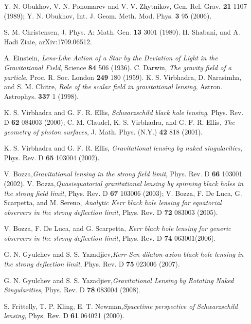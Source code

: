 \documentclass[aps,showpacs,preprintnumbers,amsmath,amssymb]{revtex4}
\begin{document}
\begin{thebibliography}{99}
 Y. N. Obukhov, V. N. Ponomarev and V. V. Zhytnikov, Gen. Rel. Grav.
{\bf21} 1107 (1989); Y. N. Obukhov, Int. J. Geom. Meth. Mod. Phys. {\bf3} 95 (2006).

 S. M. Christensen, J. Phys. A: Math. Gen. {\bf13} 3001 (1980).
H. Shabani, and A. Hadi Ziaie, arXiv:1709.06512.


 A. Einstein, \textit{Lens-Like Action of a Star by the Deviation of Light in the Gravitational Field}, Science {\bf84} 506 (1936).
 C. Darwin, \textit{The gravity field of a particle}, Proc. R. Soc. London {\bf249}  180 (1959).
 K. S. Virbhadra, D. Narasimha, and S. M. Chitre, \textit{Role of the scalar field in gravitational lensing}, Astron. Astrophys. {\bf337}  1 (1998).

 K. S. Virbhadra and G. F. R. Ellis, \textit{Schwarzschild black hole lensing}, Phys. Rev. D {\bf62} 084003 (2000); C. M. Claudel, K. S. Virbhadra, and G. F. R. Ellis, \textit{The geometry of photon surfaces}, J. Math. Phys. (N.Y.) {\bf42}  818 (2001).

  K. S. Virbhadra and G. F. R. Ellis, \textit{Gravitational lensing by naked singularities}, Phys. Rev. D {\bf65}  103004 (2002).


 V. Bozza,\textit{Gravitational lensing in the strong field limit}, Phys. Rev. D {\bf66}  103001 (2002).
 V. Bozza,\textit{Quasiequatorial gravitational lensing by spinning black holes in the strong field limit}, Phys. Rev. D {\bf67}  103006 (2003); V. Bozza, F. De Luca, G. Scarpetta, and M. Sereno, \textit{Analytic Kerr black hole lensing for equatorial observers in the strong deflection limit}, Phys. Rev. D {\bf72} 083003 (2005).

V. Bozza, F. De Luca, and G. Scarpetta, \textit{Kerr black hole lensing for generic observers in the strong deflection limit}, Phys. Rev. D {\bf74}  063001(2006).



 G. N. Gyulchev and S. S. Yazadjiev,\textit{Kerr-Sen dilaton-axion black hole lensing in the strong deflection limit}, Phys. Rev. D {\bf75}  023006 (2007).

 G. N. Gyulchev and S. S. Yazadjiev,\textit{Gravitational Lensing by Rotating Naked Singularities}, Phys. Rev. D {\bf78}  083004 (2008).

 S. Frittelly, T. P. Kling, E. T. Newman,\textit{Spacetime perspective of Schwarzschild lensing}, Phys. Rev. D {\bf 61} 064021 (2000).


\end{thebibliography}
\end{document}
